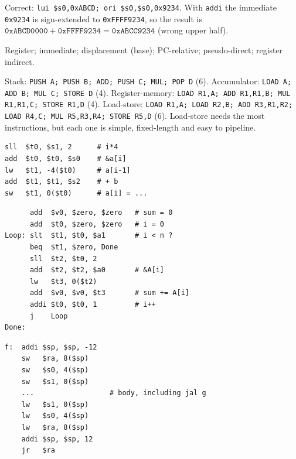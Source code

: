 \documentclass[11pt]{article}
\begin{document}
\begin{solution}[\ref{p:const}]
Correct: \texttt{lui \$s0,0xABCD; ori \$s0,\$s0,0x9234}. With \texttt{addi}
the immediate \texttt{0x9234} is sign-extended to \texttt{0xFFFF9234}, so the
result is $\texttt{0xABCD0000}+\texttt{0xFFFF9234} = \texttt{0xABCC9234}$
(wrong upper half).
\end{solution}

\begin{solution}[\ref{p:modes}]
Register; immediate; displacement (base); PC-relative; pseudo-direct;
register indirect.
\end{solution}

\begin{solution}[\ref{p:styles}]
Stack: \texttt{PUSH A; PUSH B; ADD; PUSH C; MUL; POP D} (6).
Accumulator: \texttt{LOAD A; ADD B; MUL C; STORE D} (4).
Register-memory: \texttt{LOAD R1,A; ADD R1,R1,B; MUL R1,R1,C; STORE R1,D}
(4).
Load-store: \texttt{LOAD R1,A; LOAD R2,B; ADD R3,R1,R2; LOAD R4,C; MUL
R5,R3,R4; STORE R5,D} (6). Load-store needs the most instructions, but
each one is simple, fixed-length and easy to pipeline.
\end{solution}

\begin{solution}[\ref{p:array}]
\leavevmode
\begin{lstlisting}
sll  $t0, $s1, 2      # i*4
add  $t0, $t0, $s0    # &a[i]
lw   $t1, -4($t0)     # a[i-1]
add  $t1, $t1, $s2    # + b
sw   $t1, 0($t0)      # a[i] = ...
\end{lstlisting}
\end{solution}

\begin{solution}[\ref{p:loop}]
\leavevmode
\begin{lstlisting}
      add  $v0, $zero, $zero   # sum = 0
      add  $t0, $zero, $zero   # i = 0
Loop: slt  $t1, $t0, $a1       # i < n ?
      beq  $t1, $zero, Done
      sll  $t2, $t0, 2
      add  $t2, $t2, $a0       # &A[i]
      lw   $t3, 0($t2)
      add  $v0, $v0, $t3       # sum += A[i]
      addi $t0, $t0, 1         # i++
      j    Loop
Done:
\end{lstlisting}
\end{solution}

\begin{solution}[\ref{p:frame}]
\leavevmode
\begin{lstlisting}
f:  addi $sp, $sp, -12
    sw   $ra, 8($sp)
    sw   $s0, 4($sp)
    sw   $s1, 0($sp)
    ...                  # body, including jal g
    lw   $s1, 0($sp)
    lw   $s0, 4($sp)
    lw   $ra, 8($sp)
    addi $sp, $sp, 12
    jr   $ra
\end{lstlisting}
\end{solution}
\end{document}
